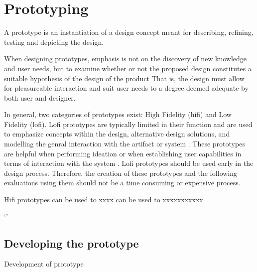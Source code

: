 \section{Prototyping} %
A prototype is an instantiation of a design concept meant for describing, refining, testing and depicting the design. \cite{BUXTON2007139_prototyping}

When designing prototypes, emphasis is not on the discovery of new knowledge and user needs, but to examine whether or not the proposed design constitutes a suitable hypothesis of the design of the product \cite{nielsen-norman-prototype-low-vs-high,BUXTON2007139_prototyping}
That is, the design must allow for pleasureable interaction and suit user needs to a degree deemed adequate by both user and designer.

In general, two categories of prototypes exist: High Fidelity (hifi) and Low Fidelity (lofi).
Lofi prototypes are typically limited in their function and are used to emphasize concepts within the design, alternative design solutions, and modelling the genral interaction with the artifact or system \cite{low-vs-high-fidelity-prototype}.
These prototypes are helpful when performing ideation %
or when establishing user capabilities in terms of interaction with the system \cite{usefullness-of-different-prototypes,low-vs-high-fidelity-prototype}. 
Lofi prototypes should be used early in the design process. 
Therefore, the creation of these prototypes and the following evaluations  using them should not be a time consuming or expensive process. \cite{usefullness-of-different-prototypes,low-vs-high-fidelity-prototype}  


Hifi prototypes can be used to xxxx
can be used to xxxxxxxxxxx

`'

    


\subsection{Developing the prototype}
Development of prototype